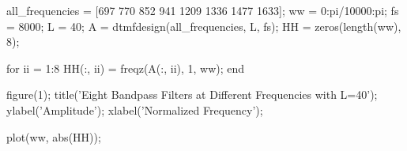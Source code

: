 all_frequencies = [697 770 852 941 1209 1336 1477 1633];
ww = 0:pi/10000:pi;
fs = 8000; %
L = 40; %
A = dtmfdesign(all_frequencies, L, fs); %
HH = zeros(length(ww), 8); %

for ii = 1:8
    HH(:, ii) = freqz(A(:, ii), 1, ww); %
end


figure(1);
title('Eight Bandpass Filters at Different Frequencies with L=40');
ylabel('Amplitude');
xlabel('Normalized Frequency');

plot(ww, abs(HH));